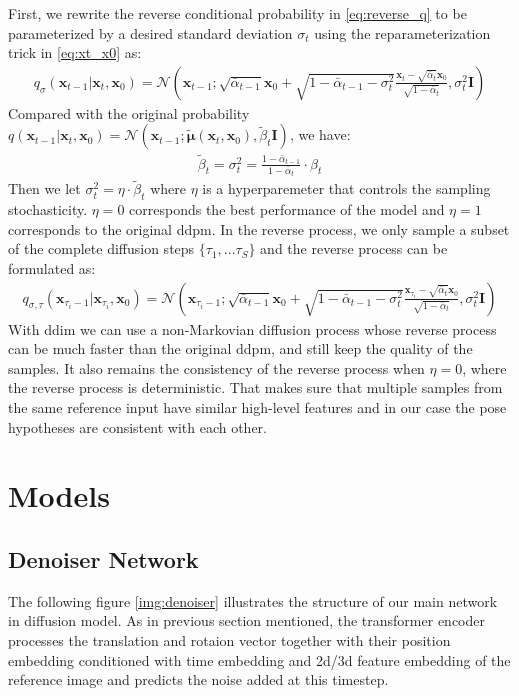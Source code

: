 \documentclass[12pt,DIV14,BCOR12mm,a4paper,footinclude=false,headinclude,parskip=half-,twoside,openright,cleardoublepage=empty,toc=index,bibliography=totoc,listof=totoc]{scrreprt}
\numberwithin{equation}{chapter}
\begin{document}
First, we rewrite the reverse conditional probability in \ref{eq:reverse_q} to be parameterized by a desired standard deviation $\sigma_{t}$ using the reparameterization trick in \ref{eq:xt_x0} as:
\begin{align}
  q_{\sigma}(\mathbf{x}_{t-1}|\mathbf{x}_{t},\mathbf{x}_{0}) = \mathcal{N} (\mathbf{x}_{t-1}; \sqrt{\bar{\alpha}_{t-1}}\mathbf{x}_{0}+\sqrt{1-\bar{\alpha}_{t-1} - \sigma_{t}^{2}}\frac{\mathbf{x}_{t}-\sqrt{\bar{\alpha}_{t}}\mathbf{x}_{0}}{\sqrt{1-\bar{\alpha}_{t}}}, \sigma_{t}^{2}\mathbf{I})
\end{align}
Compared with the original probability $q(\mathbf{x}_{t-1}|\mathbf{x}_{t},\mathbf{x}_{0}) = \mathcal{N} (\mathbf{x}_{t-1}; \boldsymbol{\tilde{\mu}}(\mathbf{x}_{t}, \mathbf{x}_{0}), \tilde{\beta}_{t}\mathbf{I})$, we have:
\begin{align}
  \tilde{\beta}_{t}=\sigma_{t}^{2}=\frac{1-\bar{\alpha}_{t-1}}{1-\bar{\alpha}_{t}}\cdot\beta_{t}
\end{align}
Then we let $\sigma_{t}^{2}=\eta\cdot\tilde{\beta}_{t}$ where $\eta$ is a hyperparemeter that controls the sampling stochasticity. $\eta=0$ corresponds the best performance of the model and $\eta=1$ corresponds to the original \gls{ddpm}. In the reverse process, we only sample a subset of the complete diffusion steps $\{\tau_{1},...\tau_{S}\}$ and the reverse process can be formulated as:
\begin{align}
  q_{\sigma,\tau}(\mathbf{x}_{\tau_{i}-1}|\mathbf{x}_{\tau_{i}},\mathbf{x}_{0}) = \mathcal{N} (\mathbf{x}_{\tau_{i}-1}; \sqrt{\bar{\alpha}_{t-1}}\mathbf{x}_{0}+\sqrt{1-\bar{\alpha}_{t-1} - \sigma_{t}^{2}}\frac{\mathbf{x}_{\tau_{i}}-\sqrt{\bar{\alpha}_{t}}\mathbf{x}_{0}}{\sqrt{1-\bar{\alpha}_{t}}}, \sigma_{t}^{2}\mathbf{I})
\end{align}
With \gls{ddim} we can use a non-Markovian diffusion process whose reverse process can be much faster than the original \gls{ddpm}, and still keep the quality of the samples. It also remains the consistency of the reverse process when $\eta=0$, where the reverse process is deterministic. That makes sure that multiple samples from the same reference input have similar high-level features and in our case the pose hypotheses are consistent with each other.
\section{Models}
\subsection{Denoiser Network}
The following figure \ref{img:denoiser} illustrates the structure of our main network in diffusion model. As in previous section mentioned, the transformer encoder processes the translation and rotaion vector together with their position embedding conditioned with time embedding and \gls{2d}/\gls{3d} feature embedding of the reference image and predicts the noise added at this timestep. 
\end{document}
